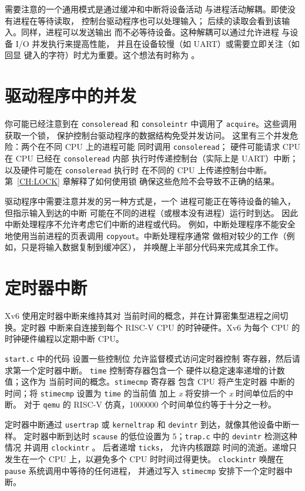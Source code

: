 需要注意的一个通用模式是通过缓冲和中断将设备活动
与进程活动解耦。即使没有进程在等待读取，
控制台驱动程序也可以处理输入；
后续的读取会看到该输入。同样，进程可以发送输出
而不必等待设备。这种解耦可以通过允许进程
与设备 I/O 并发执行来提高性能，
并且在设备较慢（如 UART）或需要立即关注（如回显
键入的字符）时尤为重要。这个想法有时称为 。

\section{驱动程序中的并发}

你可能已经注意到在 {\tt consoleread}
和 {\tt consoleintr} 中调用了 {\tt acquire}。这些调用获取一个锁，
保护控制台驱动程序的数据结构免受并发访问。
这里有三个并发危险：两个在不同 CPU 上的进程可能
同时调用 {\tt consoleread}；
硬件可能请求 CPU 在 CPU 已经在 {\tt consoleread} 内部
执行时传递控制台（实际上是
UART）中断；
以及硬件可能在 {\tt consoleread} 执行时
在不同的 CPU 上传递控制台中断。
第~\ref{CH:LOCK} 章解释了如何使用锁
确保这些危险不会导致不正确的结果。

驱动程序中需要注意并发的另一种方式是，一个
进程可能正在等待设备的输入，但指示输入到达的中断
可能在不同的进程（或根本没有进程）运行时到达。
因此中断处理程序不允许考虑它们中断的进程或代码。
例如，中断处理程序不能安全地使用当前进程的页表调用 {\tt copyout}。中断处理程序通常
做相对较少的工作（例如，只是将输入数据复制到缓冲区），
并唤醒上半部分代码来完成其余工作。

\section{定时器中断}

Xv6 使用定时器中断来维持其对
当前时间的概念，并在计算密集型进程之间切换。定时器
中断来自连接到每个 RISC-V CPU 的时钟硬件。Xv6
为每个 CPU 的时钟硬件编程以定期中断 CPU。

{\tt start.c} 中的代码
 设置一些控制位
允许监督模式访问定时器控制
寄存器，然后请求第一个定时器中断。
{\tt time} 控制寄存器包含一个
硬件以稳定速率递增的计数值；这作为
当前时间的概念。{\tt stimecmp} 寄存器
包含 CPU 将产生定时器
中断的时间；将 {\tt stimecmp} 设置为 {\tt time} 的当前值
加上 {\it x} 将安排一个 {\it x} 时间单位后的中断。
对于 {\tt qemu} 的 RISC-V
仿真，1000000 个时间单位约等于十分之一秒。

定时器中断通过 {\tt usertrap} 或 {\tt kerneltrap}
和 {\tt devintr} 到达，就像其他设备中断一样。
定时器中断到达时 {\tt scause} 的低位设置为
5；{\tt trap.c} 中的 {\tt devintr} 检测这种情况
并调用 {\tt clockintr}
。
后者递增 {\tt ticks}，
允许内核跟踪
时间的流逝。递增只发生在一个 CPU 上，以避免多个 CPU 时时间过得更快。
{\tt clockintr} 唤醒在 {\tt pause}
系统调用中等待的任何进程，
并通过写入
{\tt stimecmp} 安排下一个定时器中断。

